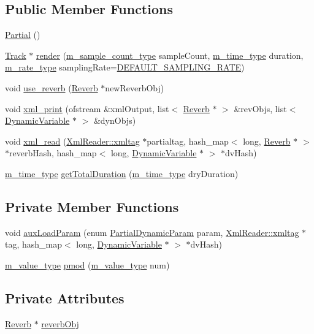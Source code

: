 \subsection*{Public Member Functions}
\begin{CompactItemize}
\item 
\hyperlink{classPartial_a0}{Partial} ()
\item 
\hyperlink{classTrack}{Track} $\ast$ \hyperlink{classPartial_a1}{render} (\hyperlink{Types_8h_a1}{m\_\-sample\_\-count\_\-type} sample\-Count, \hyperlink{Types_8h_a2}{m\_\-time\_\-type} duration, \hyperlink{Types_8h_a4}{m\_\-rate\_\-type} sampling\-Rate=\hyperlink{Types_8h_a5}{DEFAULT\_\-SAMPLING\_\-RATE})
\item 
void \hyperlink{classPartial_a2}{use\_\-reverb} (\hyperlink{classReverb}{Reverb} $\ast$new\-Reverb\-Obj)
\item 
void \hyperlink{classPartial_a3}{xml\_\-print} (ofstream \&xml\-Output, list$<$ \hyperlink{classReverb}{Reverb} $\ast$ $>$ \&rev\-Objs, list$<$ \hyperlink{classDynamicVariable}{Dynamic\-Variable} $\ast$ $>$ \&dyn\-Objs)
\item 
void \hyperlink{classPartial_a4}{xml\_\-read} (\hyperlink{classXmlReader_1_1xmltag}{Xml\-Reader::xmltag} $\ast$partialtag, hash\_\-map$<$ long, \hyperlink{classReverb}{Reverb} $\ast$ $>$ $\ast$reverb\-Hash, hash\_\-map$<$ long, \hyperlink{classDynamicVariable}{Dynamic\-Variable} $\ast$ $>$ $\ast$dv\-Hash)
\item 
\hyperlink{Types_8h_a2}{m\_\-time\_\-type} \hyperlink{classPartial_a5}{get\-Total\-Duration} (\hyperlink{Types_8h_a2}{m\_\-time\_\-type} dry\-Duration)
\end{CompactItemize}
\subsection*{Private Member Functions}
\begin{CompactItemize}
\item 
void \hyperlink{classPartial_d0}{aux\-Load\-Param} (enum \hyperlink{Partial_8h_a20}{Partial\-Dynamic\-Param} param, \hyperlink{classXmlReader_1_1xmltag}{Xml\-Reader::xmltag} $\ast$tag, hash\_\-map$<$ long, \hyperlink{classDynamicVariable}{Dynamic\-Variable} $\ast$ $>$ $\ast$dv\-Hash)
\item 
\hyperlink{Types_8h_a3}{m\_\-value\_\-type} \hyperlink{classPartial_d1}{pmod} (\hyperlink{Types_8h_a3}{m\_\-value\_\-type} num)
\end{CompactItemize}
\subsection*{Private Attributes}
\begin{CompactItemize}
\item 
\hyperlink{classReverb}{Reverb} $\ast$ \hyperlink{classPartial_r0}{reverb\-Obj}
\end{CompactItemize}


